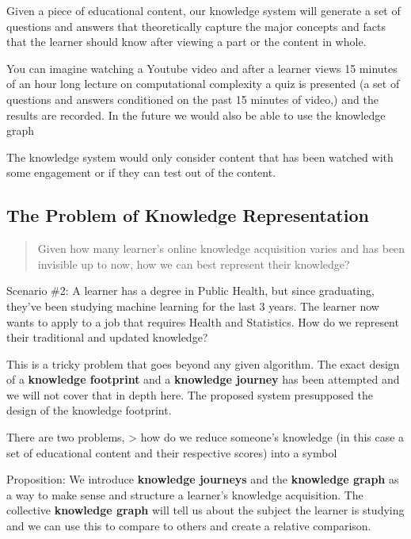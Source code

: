 \documentclass{acm_proc_article-sp}
\begin{document}
Given a piece of educational content, our knowledge system will generate
a set of questions and answers that theoretically capture the major
concepts and facts that the learner should know after viewing a part or
the content in whole.

You can imagine watching a Youtube video and after a learner views 15
minutes of an hour long lecture on computational complexity a quiz is
presented (a set of questions and answers conditioned on the past 15
minutes of video,) and the results are recorded. In the future we would
also be able to use the knowledge graph

The knowledge system would only consider content that has been watched
with some engagement or if they can test out of the content.

\subsection{The Problem of Knowledge
Representation}\label{the-problem-of-knowledge-representation}

\begin{quote}
Given how many learner's online knowledge acquisition varies and has
been invisible up to now, how we can best represent their knowledge?
\end{quote}

Scenario \#2: A learner has a degree in Public Health, but since
graduating, they've been studying machine learning for the last 3 years.
The learner now wants to apply to a job that requires Health and
Statistics. How do we represent their traditional and updated knowledge?

This is a tricky problem that goes beyond any given algorithm. The exact
design of a \textbf{knowledge footprint} and a \textbf{knowledge
journey} has been attempted and we will not cover that in depth here.
The proposed system presupposed the design of the knowledge footprint.

There are two problems, \textgreater{} how do we reduce someone's
knowledge (in this case a set of educational content and their
respective scores) into a symbol

Proposition: We introduce \textbf{knowledge journeys} and the
\textbf{knowledge graph} as a way to make sense and structure a
learner's knowledge acquisition. The collective \textbf{knowledge graph}
will tell us about the subject the learner is studying and we can use
this to compare to others and create a relative comparison.
\end{document}
